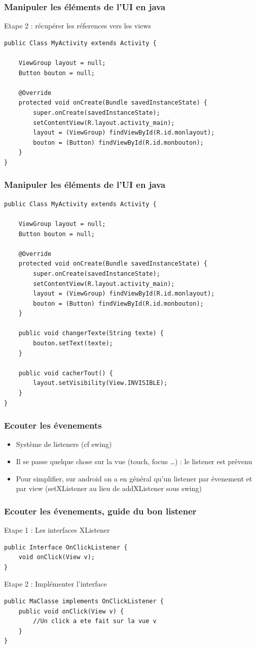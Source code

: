 \documentclass{beamer}
\begin{document}
\begin{frame}[fragile]
\frametitle{Manipuler les éléments de l'UI en java}
Etape 2 : récupérer les réferences vers les views
\begin{lstlisting}
public Class MyActivity extends Activity {

    ViewGroup layout = null;
    Button bouton = null;

    @Override
    protected void onCreate(Bundle savedInstanceState) {
        super.onCreate(savedInstanceState);
        setContentView(R.layout.activity_main);
        layout = (ViewGroup) findViewById(R.id.monlayout);
        bouton = (Button) findViewById(R.id.monbouton);
    }
}
\end{lstlisting}
\end{frame}
\begin{frame}[fragile]
\frametitle{Manipuler les éléments de l'UI en java}
\begin{lstlisting}
public Class MyActivity extends Activity {

    ViewGroup layout = null;
    Button bouton = null;

    @Override
    protected void onCreate(Bundle savedInstanceState) {
        super.onCreate(savedInstanceState);
        setContentView(R.layout.activity_main);
        layout = (ViewGroup) findViewById(R.id.monlayout);
        bouton = (Button) findViewById(R.id.monbouton);
    }
	
    public void changerTexte(String texte) {
        bouton.setText(texte);
    }
	
    public void cacherTout() {
        layout.setVisibility(View.INVISIBLE);
    }
}
\end{lstlisting}
\end{frame}
\begin{frame}[fragile]
\frametitle{Ecouter les évenements}
\begin{itemize}
 \item Système de listeners (cf swing)
 \item Il se passe quelque chose sur la vue (touch, focus \ldots) : le listener
 est prévenu
 \item Pour simplifier, sur android on a en général qu'un listener par évenement
 et par view (setXListener au lieu de addXListener sous swing)
 \end{itemize}
\end{frame}
\begin{frame}[fragile]
\frametitle{Ecouter les évenements, guide du bon listener}
Etape 1 : Les interfaces XListener
\begin{lstlisting}
public Interface OnClickListener {
    void onClick(View v);
}
\end{lstlisting}
Etape 2 : Implémenter l'interface
\begin{lstlisting}
public MaClasse implements OnClickListener {
    public void onClick(View v) {
        //Un click a ete fait sur la vue v
    }
}
\end{lstlisting}
\end{frame}
\end{document}
